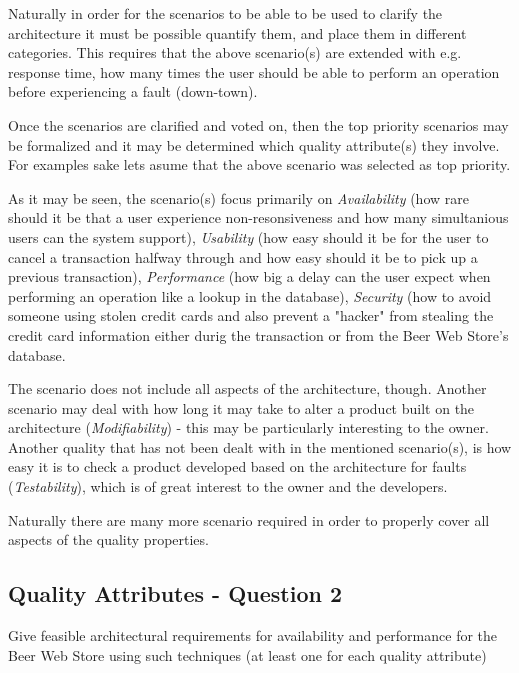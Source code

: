 Naturally in order for the scenarios to be able to be used to clarify the architecture it must be possible quantify them, and place them in different categories. This requires that the above scenario(s) are extended with e.g. response time, how many times the user should be able to perform an operation before experiencing a fault (down-town). 

Once the scenarios are clarified and voted on, then the top priority scenarios may be formalized and it may be determined which quality attribute(s) they involve. For examples sake lets asume that the above scenario was selected as top priority.


As it may be seen, the scenario(s) focus primarily on \emph{Availability} (how rare should it be that a user experience non-resonsiveness and how many simultanious users can the system support), \emph{Usability} (how easy should it be for the user to cancel a transaction halfway through and how easy should it be to pick up a previous transaction), \emph{Performance} (how big a delay can the user expect when performing an operation like a lookup in the database), \emph{Security} (how to avoid someone using stolen credit cards and also prevent a "hacker" from stealing the credit card information either durig the transaction or from the Beer Web Store's database.

The scenario does not include all aspects of the architecture, though. Another scenario may deal with how long it may take to alter a product built on the architecture (\emph{Modifiability}) - this may be particularly interesting to the owner. Another quality that has not been dealt with in the mentioned scenario(s), is how easy it is to check a product developed based on the architecture for faults (\emph{Testability}), which is of great interest to the owner and the developers.

Naturally there are many more scenario required in order to properly cover all aspects of the quality properties. 

\subsection{Quality Attributes - Question 2}

\begin{question}
Give feasible architectural requirements for availability
and performance for the Beer Web Store using such techniques (at
least one for each quality attribute)
\end{question}

